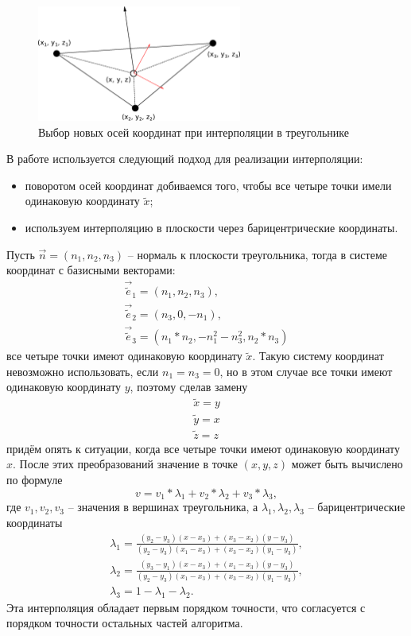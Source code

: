 \begin{figure}[htp]
\centering
\includegraphics[width=0.6\textwidth]{eps/triangle_interpolation.eps}
\caption{Выбор новых осей координат при интерполяции в треугольнике}
\label{pic:triangle_interpolation}
\end{figure}
В работе используется следующий подход для реализации интерполяции:
\begin{itemize}
	\item поворотом осей координат добиваемся того, чтобы все четыре точки имели одинаковую координату $\tilde{x}$;
	\item используем интерполяцию в плоскости через барицентрические координаты.
\end{itemize}
Пусть $\vec{n}=(n_1,n_2,n_3)$ -- нормаль к плоскости треугольника, тогда в системе координат с базисными векторами:
\begin{eqnarray}
\label{eq:new_coords}
\vec{\tilde{e}}_1=(n_1, n_2, n_3), \nonumber \\
\vec{\tilde{e}}_2=(n_3, 0, -n_1), \nonumber \\
\vec{\tilde{e}}_3=(n_1*n_2, -n_1^2-n_3^2, n_2*n_3)
\end{eqnarray}
все четыре точки имеют одинаковую координату $\tilde{x}$. Такую систему координат невозможно использовать, если $n_1=n_3=0$, но в этом случае все точки имеют одинаковую координату $y$, поэтому сделав замену
\begin{eqnarray}
\label{eq:new_coords_2}
\tilde{x}=y \\
\tilde{y}=x \nonumber \\
\tilde{z}=z
\end{eqnarray}
придём опять к ситуации, когда все четыре точки имеют одинаковую координату $x$.
После этих преобразований значение в точке $(x,y,z)$ может быть вычислено по формуле
\begin{equation}
\label{eq:itriangle_nterpolation}
v=v_1*\lambda_1+v_2*\lambda_2+v_3*\lambda_3, 
\end{equation}
где $v_1,v_2,v_3$ -- значения в вершинах треугольника, а $\lambda_1,\lambda_2,\lambda_3$ -- барицентрические координаты
\begin{eqnarray}
\label{eq:barycentric_coords}
\lambda_1=\frac{(y_2-y_3)(x-x_3)+(x_3-x_2)(y-y_3)}{(y_2-y_3)(x_1-x_3)+(x_3-x_2)(y_1-y_3)}, \nonumber \\
\lambda_2=\frac{(y_3-y_1)(x-x_3)+(x_1-x_3)(y-y_3)}{(y_2-y_3)(x_1-x_3)+(x_3-x_2)(y_1-y_3)}, \nonumber \\
\lambda_3=1-\lambda_1-\lambda_2.
\end{eqnarray}
Эта интерполяция обладает первым порядком точности, что согласуется с порядком точности остальных частей алгоритма.
